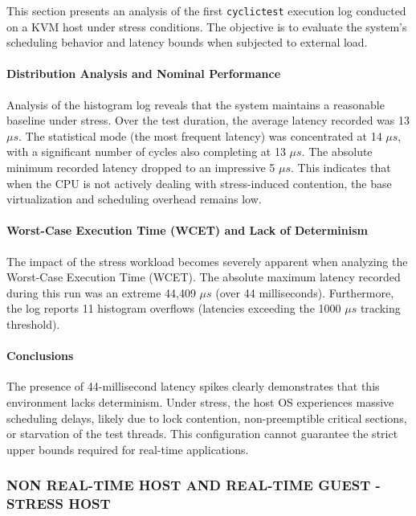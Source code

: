 This section presents an analysis of the first \texttt{cyclictest}
execution log conducted on a KVM host under stress conditions. The
objective is to evaluate the system's scheduling behavior and latency
bounds when subjected to external load.

\paragraph{Distribution Analysis and Nominal
Performance}\label{distribution-analysis-and-nominal-performance-1}

Analysis of the histogram log reveals that the system maintains a
reasonable baseline under stress. Over the test duration, the average
latency recorded was 13 $\mu s$. The statistical mode (the most frequent
latency) was concentrated at 14 $\mu s$, with a significant number of cycles
also completing at 13 $\mu s$. The absolute minimum recorded latency dropped
to an impressive 5 $\mu s$. This indicates that when the CPU is not actively
dealing with stress-induced contention, the base virtualization and
scheduling overhead remains low.

\paragraph{Worst-Case Execution Time (WCET) and Lack of
Determinism}\label{worst-case-execution-time-wcet-and-lack-of-determinism-1}

The impact of the stress workload becomes severely apparent when
analyzing the Worst-Case Execution Time (WCET). The absolute maximum
latency recorded during this run was an extreme 44,409 $\mu s$ (over 44
milliseconds). Furthermore, the log reports 11 histogram overflows
(latencies exceeding the 1000 $\mu s$ tracking threshold).

\paragraph{Conclusions}\label{conclusions}

The presence of 44-millisecond latency spikes clearly demonstrates that
this environment lacks determinism. Under stress, the host OS
experiences massive scheduling delays, likely due to lock contention,
non-preemptible critical sections, or starvation of the test threads.
This configuration cannot guarantee the strict upper bounds required for
real-time applications.

\subsubsection{NON REAL-TIME HOST AND REAL-TIME GUEST -STRESS
HOST}\label{non-real-time-host-and-real-time-guest--stress-host}

